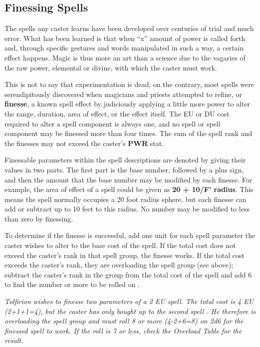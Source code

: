 \begin{multicols*}{2}
\subsection{Finessing Spells}
The spells any caster learns have been developed over centuries of trial and much error. What has been learned is that when “x” amount of power is called forth and, through specific gestures and words manipulated in such a way, a
certain effect happens. Magic is thus more an art than a science due to the vagaries of the raw power, elemental or divine, with which the caster must work.

This is not to say that experimentation is dead; on the contrary, most spells were serendipitously discovered when magicians and priests attempted to refine, or \textbf{finesse}, a known spell effect by judiciously applying a little more power to alter the range, duration, area of effect, or the effect itself. The EU or DU cost required to alter a spell component is always one, and no spell or spell component may be finessed more than four times. The sum of the spell rank and the finesses may not exceed the caster’s \textbf{PWR} stat.

Finessable parameters within the spell descriptions are denoted by giving their values in two parts. The first part is the base number, followed by a plus sign, and then the
amount that the base number may be modified by each finesse. For example, the area of effect of a spell could be given as \textbf{20 + 10/F’ radius}. This means the spell normally occupies a 20 foot radius sphere, but each finesse can add or subtract up to 10 feet to this radius. No number may be modified to less than zero by finessing.

To determine if the finesse is successful, add one unit for each spell parameter the caster wishes to alter to the base cost of the spell. If the total cost does not exceed the caster’s rank in that spell group, the finesse works. If the total cost exceeds the caster’s rank, they are overloading the spell group (see above); subtract the caster’s rank in the group from the total cost of the spell and add 6 to find the number or more to be rolled on .

\textit{Tolfirion wishes to finesse two parameters of a 2 EU spell. The total cost is 4 EU (2+1+1=4), but the caster has only bought up to the second spell . He therefore is overloading the spell group and must roll 8 or more (4-2+6=8) on 2d6 for the finessed spell to work. If the roll is 7 or less, check the Overload Table for the result.}


\end{multicols*}
